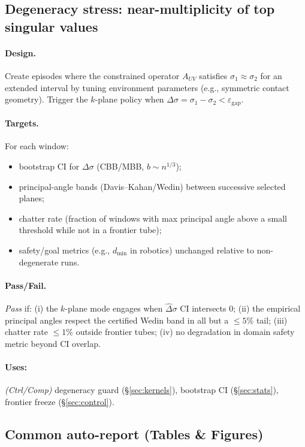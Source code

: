 \documentclass[10pt]{article}
\begin{document}
\subsection{Degeneracy stress: near-multiplicity of top singular values}\label{subsec:degstress}

\paragraph{Design.} Create episodes where the constrained operator $A_{UV}$ satisfies $\sigma_1\approx\sigma_2$ for an extended interval by tuning environment parameters (e.g., symmetric contact geometry). Trigger the $k$-plane policy when $\Delta\sigma=\sigma_1-\sigma_2<\varepsilon_{\mathrm{gap}}$.

\paragraph{Targets.} For each window:
\begin{itemize}[leftmargin=*]
\item bootstrap CI for $\Delta\sigma$ (CBB/MBB, $b\sim n^{1/3}$);
\item principal-angle bands (Davis–Kahan/Wedin) between successive selected planes;
\item chatter rate (fraction of windows with max principal angle above a small threshold while not in a frontier tube);
\item safety/goal metrics (e.g., $d_{\min}$ in robotics) unchanged relative to non-degenerate runs.
\end{itemize}

\paragraph{Pass/Fail.} \emph{Pass} if: (i) the $k$-plane mode engages when $\widehat\Delta\sigma$ CI intersects $0$; (ii) the empirical principal angles respect the certified Wedin band in all but a $\le 5\%$ tail; (iii) chatter rate $\le 1\%$ outside frontier tubes; (iv) no degradation in domain safety metric beyond CI overlap.

\paragraph{Uses:} \textit{(Ctrl/Comp)} degeneracy guard (§\ref{sec:kernels}), bootstrap CI (§\ref{sec:stats}), frontier freeze (§\ref{sec:control}).

\subsection{Common auto-report (Tables \& Figures)}\label{subsec:auto-report}
\end{document}
